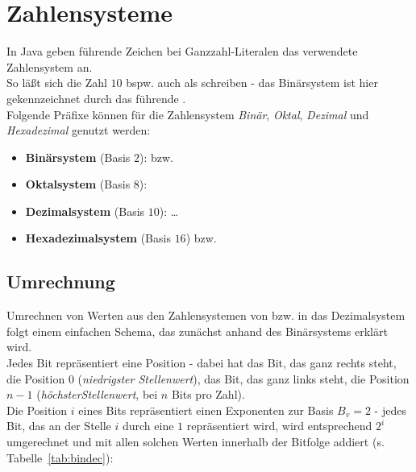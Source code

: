 
\section{Zahlensysteme}

In Java geben führende Zeichen bei Ganzzahl-Literalen das verwendete Zahlensystem an.\\

\noindent
So läßt sich die Zahl $10$ bspw. auch als  schreiben - das Binärsystem ist hier gekennzeichnet durch das führende .\\

\noindent
Folgende Präfixe können für die Zahlensystem \textit{Binär}, \textit{Oktal}, \textit{Dezimal} und \textit{Hexadezimal} genutzt werden:

\begin{itemize}
    \item \textbf{Binärsystem} (Basis $2$):  bzw. 
    \item \textbf{Oktalsystem} (Basis $8$): 
    \item \textbf{Dezimalsystem} (Basis $10$):  \ldots {}
    \item \textbf{Hexadezimalsystem} (Basis $16$)  bzw. 
\end{itemize}

\subsection{Umrechnung}

Umrechnen von Werten aus den Zahlensystemen von bzw. in das  Dezimalsystem folgt einem einfachen Schema, das zunächst anhand des Binärsystems erklärt wird.\\

Jedes Bit repräsentiert eine Position - dabei hat das Bit, das ganz rechts steht, die Position $0$ (\textit{niedrigster Stellenwert}), das Bit, das ganz links steht, die Position $n-1$ (\textit{höchsterStellenwert}, bei $n$ Bits pro Zahl).\\
Die Position $i$ eines Bits repräsentiert einen Exponenten zur Basis $B_v=2$ - jedes Bit, das an der Stelle $i$ durch eine $1$ repräsentiert wird, wird entsprechend $2^i$ umgerechnet und mit allen solchen Werten innerhalb der Bitfolge addiert (s. Tabelle~\ref{tab:bindec}):

